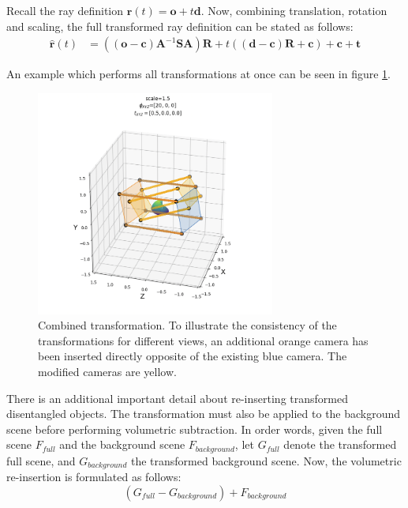 Recall the ray definition $\textbf{r}(t) = \textbf{o} + t \textbf{d}$. Now, combining translation, rotation and scaling, the full transformed ray definition can be stated as follows:
\begin{align}
    \hat{\textbf{r}}(t) &= ((\textbf{o}-\textbf{c}) \textbf{A}^{-1} \textbf{S} \textbf{A})\textbf{R} + t \left((\textbf{d} - \textbf{c})\textbf{R} + \textbf{c}\right) + \textbf{c} + \textbf{t}
\end{align}

An example which performs all transformations at once can be seen in figure \ref{fig:manip-comb}.
\begin{figure}[H]
    \centering
    \includegraphics[width=0.7\textwidth]{figures/manip-comb.png}
    \caption{Combined transformation. To illustrate the consistency of the transformations for different views, an additional orange camera has been inserted directly opposite of the existing blue camera. The modified cameras are yellow.}
    \label{fig:manip-comb}
\end{figure}

There is an additional important detail about re-inserting transformed disentangled objects. The transformation must also be applied to the background scene before performing volumetric subtraction. In order words, given the full scene $F_{full}$ and the background scene $F_{background}$, let $G_{full}$ denote the transformed full scene, and $G_{background}$ the transformed background scene. Now, the volumetric re-insertion is formulated as follows:
\begin{equation}
    (G_{full} - G_{background}) + F_{background}
\end{equation}

